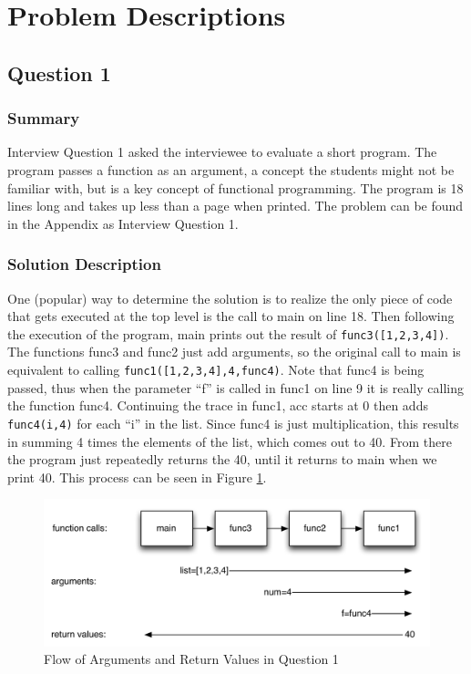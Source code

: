 \section{Problem Descriptions}

\subsection{Question 1}
\subsubsection{Summary}
Interview Question 1 asked the interviewee to evaluate a short program.
The program passes a function as an argument, a concept the students might not be familiar with, but is a key concept of functional programming.
The program is 18 lines long and takes up less than a page when printed.
The problem can be found in the Appendix as Interview Question 1.
\subsubsection{Solution Description}

One (popular) way to determine the solution is to realize the only piece of code that gets executed at the top level is the call to main on line 18.
Then following the execution of the program, main prints out the result of \texttt{func3([1,2,3,4])}.
The functions func3 and func2 just add arguments, so the original call to main is equivalent to calling \texttt{func1([1,2,3,4],4,func4)}.
Note that func4 is being passed, thus when the parameter ``f'' is called in func1 on line 9 it is really calling the function func4.
Continuing the trace in func1, acc starts at $0$ then adds \texttt{func4(i,4)} for each ``i'' in the list.
Since func4 is just multiplication, this results in summing 4 times the elements of the list, which comes out to 40.
From there the program just repeatedly returns the 40, until it returns to main when we print 40.
This process can be seen in Figure \ref{fig-q1}.

\begin{figure}[t]
\centering
\includegraphics[width=1.0\textwidth]{Q1diagram.pdf}
\caption{Flow of Arguments and Return Values in Question 1}
\label{fig-q1}
\end{figure}
 
